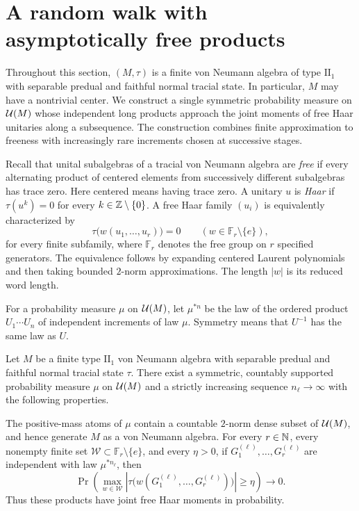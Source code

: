 \section{A random walk with asymptotically free products}\label{sec:walk}

Throughout this section, $(M,\tau)$ is a finite von Neumann algebra of
type $\mathrm{II}_1$ with separable predual and faithful normal tracial
state.  In particular, $M$ may have a nontrivial center.  We construct a
single symmetric probability measure on $\mathcal U(M)$ whose independent long
products approach the joint moments of free Haar unitaries along a
subsequence.  The construction combines finite approximation to freeness
with increasingly rare increments chosen at successive stages.

Recall that unital subalgebras of a tracial von Neumann algebra are
\emph{free} if every alternating product of centered elements from
successively different subalgebras has trace zero.  Here centered means
having trace zero.  A unitary $u$ is \emph{Haar} if
$\tau(u^k)=0$ for every $k\in\mathbb Z\setminus\{0\}$.  A free Haar family
$(u_i)$ is equivalently characterized by
\[
 \tau\bigl(w(u_1,\ldots,u_r)\bigr)=0
 \qquad(w\in\mathbb F_r\setminus\{e\}),
\]
for every finite subfamily, where $\mathbb F_r$ denotes the free group on
$r$ specified generators.  The equivalence follows by expanding centered
Laurent polynomials and then taking bounded $2$-norm approximations.
The length $|w|$ is its reduced word length.

For a probability measure $\mu$ on $\mathcal U(M)$, let $\mu^{*n}$ be the law
of the ordered product $U_1\cdots U_n$ of independent increments of
law $\mu$.  Symmetry means that $U^{-1}$ has the same law as $U$.

\begin{theorem}\label{thm:walk}
Let $M$ be a finite type $\mathrm{II}_1$ von Neumann algebra with
separable predual and faithful normal tracial state $\tau$.  There
exist a symmetric, countably supported probability measure $\mu$ on
$\mathcal U(M)$ and a strictly increasing sequence $n_\ell\to\infty$ with the
following properties.

The positive-mass atoms of $\mu$ contain a countable $2$-norm dense
subset of $\mathcal U(M)$, and hence generate $M$ as a von Neumann algebra.
For every $r\in\mathbb N$, every nonempty finite set
$\mathcal W\subset\mathbb F_r\setminus\{e\}$, and every $\eta>0$, if
$G_1^{(\ell)},\ldots,G_r^{(\ell)}$ are independent with law
$\mu^{*n_\ell}$, then
\[
 \Pr\left(
   \max_{w\in\mathcal W}
   \left|\tau\bigl(w(G_1^{(\ell)},\ldots,G_r^{(\ell)})\bigr)\right|
   \geq\eta
 \right)\longrightarrow0.
\]
Thus these products have joint free Haar moments in probability.
\end{theorem}

